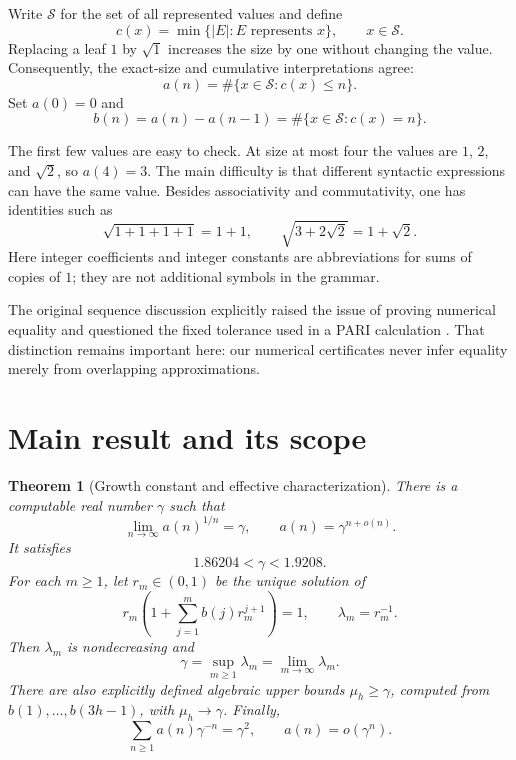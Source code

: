 \documentclass[11pt,letterpaper]{article}
\numberwithin{equation}{section}
\newtheorem{theorem}{Theorem}[section]
\theoremstyle{definition}
\newcommand{\Sset}{\mathcal S}
\begin{document}
Write $\Sset$ for the set of all represented values and define
\[
 c(x)=\min\{|E|:E\text{ represents }x\},\qquad x\in\Sset.
\]
Replacing a leaf $1$ by $\sqrt1$ increases the size by one without changing
the value. Consequently, the exact-size and cumulative interpretations agree:
\begin{equation}\label{eq:cumulative}
 a(n)=\#\{x\in\Sset:c(x)\le n\}.
\end{equation}
Set $a(0)=0$ and
\begin{equation}\label{eq:bdef}
 b(n)=a(n)-a(n-1)=\#\{x\in\Sset:c(x)=n\}.
\end{equation}

The first few values are easy to check. At size at most four the values are
$1$, $2$, and $\sqrt2$, so $a(4)=3$. The main difficulty is that different
syntactic expressions can have the same value. Besides associativity and
commutativity, one has identities such as
\[
 \sqrt{1+1+1+1}=1+1,
 \qquad
 \sqrt{3+2\sqrt2}=1+\sqrt2.
\]
Here integer coefficients and integer constants are abbreviations for sums
of copies of $1$; they are not additional symbols in the grammar.

The original sequence discussion explicitly raised the issue of proving
numerical equality and questioned the fixed tolerance used in a PARI
calculation \cite{discussion}. That distinction remains important here:
our numerical certificates never infer equality merely from overlapping
approximations.

\section{Main result and its scope}

\begin{theorem}[Growth constant and effective characterization]\label{thm:main}
There is a computable real number $\gamma$ such that
\begin{equation}\label{eq:mainlimit}
 \lim_{n\to\infty}a(n)^{1/n}=\gamma,
 \qquad
 a(n)=\gamma^{n+o(n)}.
\end{equation}
It satisfies
\begin{equation}\label{eq:numericalbounds}
 1.86204<\gamma<1.9208.
\end{equation}
For each $m\ge1$, let $r_m\in(0,1)$ be the unique solution of
\begin{equation}\label{eq:rm}
 r_m\left(1+\sum_{j=1}^m b(j)r_m^{j+1}\right)=1,
 \qquad \lambda_m=r_m^{-1}.
\end{equation}
Then $\lambda_m$ is nondecreasing and
\begin{equation}\label{eq:sup}
 \gamma=\sup_{m\ge1}\lambda_m=\lim_{m\to\infty}\lambda_m.
\end{equation}
There are also explicitly defined algebraic upper bounds $\mu_h\ge\gamma$,
computed from $b(1),\ldots,b(3h-1)$, with $\mu_h\to\gamma$.
Finally,
\begin{equation}\label{eq:criticalsum}
 \boxed{\displaystyle \sum_{n\ge1}a(n)\gamma^{-n}=\gamma^2,}
 \qquad a(n)=o(\gamma^n).
\end{equation}
\end{theorem}
\end{document}
